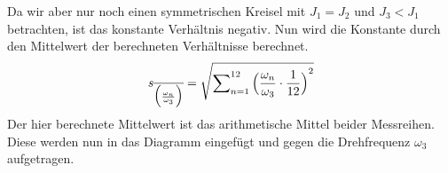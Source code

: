 Da wir aber nur noch einen symmetrischen Kreisel mit $J_1 = J_2$ und $J_3<J_1$ betrachten, ist das konstante Verh\"altnis  negativ. Nun wird die Konstante durch den Mittelwert der berechneten Verh\"altnisse berechnet.
\begin{equation}
s_{\overline{\Bigl(\frac{\omega_n}{\omega_3}\Bigr)}} = \sqrt{\sum\nolimits_{n=1}^{12}{\Bigl(\frac{\omega_n}{\omega_3}\cdot{\frac{1}{12}\Bigr)}^2}}
\end{equation}
Der hier berechnete Mittelwert ist das arithmetische Mittel beider Messreihen. Diese werden nun in das Diagramm eingef\"ugt und gegen die Drehfrequenz $\omega_3$ aufgetragen. 